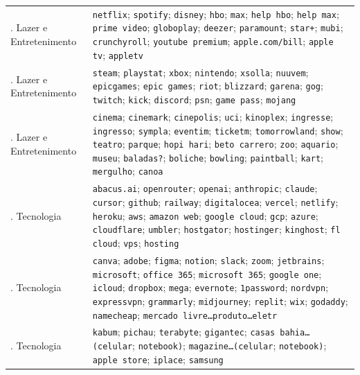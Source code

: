 \begin{apendicesenv}
\begin{longtable}{>{\raggedright\arraybackslash}p{3.1cm} >{\raggedright\arraybackslash}p{11.6cm}}
15. Lazer e Entretenimento & \texttt{netflix}; \texttt{spotify}; \texttt{disney}; \texttt{hbo}; \texttt{max}; \texttt{help~hbo}; \texttt{help~max}; \texttt{prime video}; \texttt{globoplay}; \texttt{deezer}; \texttt{paramount}; \texttt{star+}; \texttt{mubi}; \texttt{crunchyroll}; \texttt{youtube~premium}; \texttt{apple.com/bill}; \texttt{apple tv}; \texttt{appletv} \\
\addlinespace[2pt]
16. Lazer e Entretenimento & \texttt{steam}; \texttt{playstat}; \texttt{xbox}; \texttt{nintendo}; \texttt{xsolla}; \texttt{nuuvem}; \texttt{epicgames}; \texttt{epic games}; \texttt{riot}; \texttt{blizzard}; \texttt{garena}; \texttt{gog}; \texttt{twitch}; \texttt{kick}; \texttt{discord}; \texttt{psn}; \texttt{game~pass}; \texttt{mojang} \\
\addlinespace[2pt]
17. Lazer e Entretenimento & \texttt{cinema}; \texttt{cinemark}; \texttt{cinepolis}; \texttt{uci}; \texttt{kinoplex}; \texttt{ingresse}; \texttt{ingresso}; \texttt{sympla}; \texttt{eventim}; \texttt{ticketm}; \texttt{tomorrowland}; \texttt{show}; \texttt{teatro}; \texttt{parque}; \texttt{hopi hari}; \texttt{beto carrero}; \texttt{zoo}; \texttt{aquario}; \texttt{museu}; \texttt{baladas?}; \texttt{boliche}; \texttt{bowling}; \texttt{paintball}; \texttt{kart}; \texttt{mergulho}; \texttt{canoa} \\
\addlinespace[2pt]
18. Tecnologia & \texttt{abacus.ai}; \texttt{openrouter}; \texttt{openai}; \texttt{anthropic}; \texttt{claude}; \texttt{cursor}; \texttt{github}; \texttt{railway}; \texttt{digitalocea}; \texttt{vercel}; \texttt{netlify}; \texttt{heroku}; \texttt{aws}; \texttt{amazon web}; \texttt{google cloud}; \texttt{gcp}; \texttt{azure}; \texttt{cloudflare}; \texttt{umbler}; \texttt{hostgator}; \texttt{hostinger}; \texttt{kinghost}; \texttt{fl cloud}; \texttt{vps}; \texttt{hosting} \\
\addlinespace[2pt]
19. Tecnologia & \texttt{canva}; \texttt{adobe}; \texttt{figma}; \texttt{notion}; \texttt{slack}; \texttt{zoom}; \texttt{jetbrains}; \texttt{microsoft}; \texttt{office 365}; \texttt{microsoft 365}; \texttt{google one}; \texttt{icloud}; \texttt{dropbox}; \texttt{mega}; \texttt{evernote}; \texttt{1password}; \texttt{nordvpn}; \texttt{expressvpn}; \texttt{grammarly}; \texttt{midjourney}; \texttt{replit}; \texttt{wix}; \texttt{godaddy}; \texttt{namecheap}; \texttt{mercado livre…produto…eletr} \\
\addlinespace[2pt]
20. Tecnologia & \texttt{kabum}; \texttt{pichau}; \texttt{terabyte}; \texttt{gigantec}; \texttt{casas bahia…(celular}; \texttt{notebook)}; \texttt{magazine…(celular}; \texttt{notebook)}; \texttt{apple store}; \texttt{iplace}; \texttt{samsung} \\

\end{longtable}
\end{apendicesenv}
